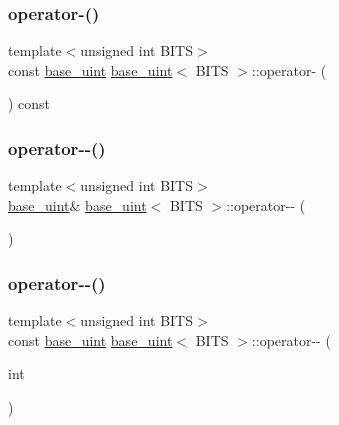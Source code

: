 \mbox{\label{classbase__uint_a3b758876b828c6faffdc2a2880122595}} 
\subsubsection{\texorpdfstring{operator-\/()}{operator-()}}
{\footnotesize\ttfamily template$<$unsigned int B\+I\+TS$>$ \\
const \mbox{\hyperlink{classbase__uint}{base\+\_\+uint}} \mbox{\hyperlink{classbase__uint}{base\+\_\+uint}}$<$ B\+I\+TS $>$\+::operator-\/ (\begin{DoxyParamCaption}{ }\end{DoxyParamCaption}) const\hspace{0.3cm}{\ttfamily [inline]}}

\mbox{\label{classbase__uint_a2cc581d32afac619acd12601ddea4180}} 
\subsubsection{\texorpdfstring{operator-\/-\/()}{operator--()}\hspace{0.1cm}{\footnotesize\ttfamily [1/2]}}
{\footnotesize\ttfamily template$<$unsigned int B\+I\+TS$>$ \\
\mbox{\hyperlink{classbase__uint}{base\+\_\+uint}}\& \mbox{\hyperlink{classbase__uint}{base\+\_\+uint}}$<$ B\+I\+TS $>$\+::operator-\/-\/ (\begin{DoxyParamCaption}{ }\end{DoxyParamCaption})\hspace{0.3cm}{\ttfamily [inline]}}

\mbox{\label{classbase__uint_a78a8e46c434c0e61be86282fe9543587}} 
\subsubsection{\texorpdfstring{operator-\/-\/()}{operator--()}\hspace{0.1cm}{\footnotesize\ttfamily [2/2]}}
{\footnotesize\ttfamily template$<$unsigned int B\+I\+TS$>$ \\
const \mbox{\hyperlink{classbase__uint}{base\+\_\+uint}} \mbox{\hyperlink{classbase__uint}{base\+\_\+uint}}$<$ B\+I\+TS $>$\+::operator-\/-\/ (\begin{DoxyParamCaption}\item[{int}]{ }\end{DoxyParamCaption})\hspace{0.3cm}{\ttfamily [inline]}}

